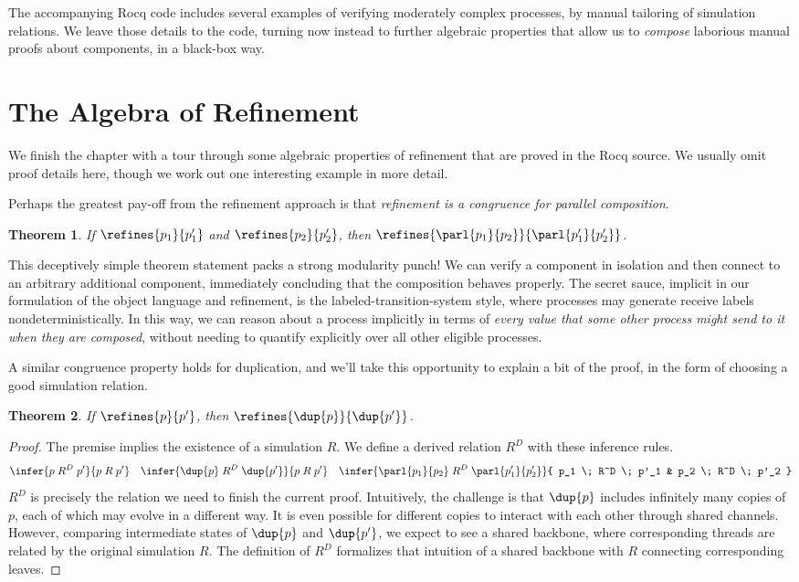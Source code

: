 \documentclass{amsbook}
\newtheorem{theorem}{Theorem}[chapter]
\theoremstyle{definition}
\theoremstyle{remark}
\numberwithin{section}{chapter}
\numberwithin{equation}{chapter}
\begin{document}
The accompanying Rocq code includes several examples of verifying moderately complex processes, by manual tailoring of simulation relations.
We leave those details to the code, turning now instead to further algebraic properties that allow us to \emph{compose} laborious manual proofs about components, in a black-box way.


\section{The Algebra of Refinement}

We finish the chapter with a tour through some algebraic properties of refinement that are proved in the Rocq source.
We usually omit proof details here, though we work out one interesting example in more detail.

Perhaps the greatest pay-off from the refinement approach is that \emph{refinement is a congruence for parallel composition}.
\begin{theorem}
  If $\refines{p_1}{p'_1}$ and $\refines{p_2}{p'_2}$, then $\refines{\parl{p_1}{p_2}}{\parl{p'_1}{p'_2}}$.
\end{theorem}

\modularity
This deceptively simple theorem statement packs a strong modularity punch!
We can verify a component in isolation and then connect to an arbitrary additional component, immediately concluding that the composition behaves properly.
The secret sauce, implicit in our formulation of the object language and refinement, is the labeled-transition-system style, where processes may generate receive labels nondeterministically.
In this way, we can reason about a process implicitly in terms of \emph{every value that some other process might send to it when they are composed}, without needing to quantify explicitly over all other eligible processes.

A similar congruence property holds for duplication, and we'll take this opportunity to explain a bit of the proof, in the form of choosing a good simulation relation.
\begin{theorem}
  If $\refines{p}{p'}$, then $\refines{\dup{p}}{\dup{p'}}$.
\end{theorem}
\begin{proof}
  The premise implies the existence of a simulation $R$.
  We define a derived relation $R^D$ with these inference rules.
  $$\infer{p \; R^D \; p'}{
    p \; R \; p'
  }
  \quad \infer{\dup{p} \; R^D \; \dup{p'}}{
    p \; R \; p'
  }
  \quad \infer{\parl{p_1}{p_2} \; R^D \; \parl{p'_1}{p'_2}}{
    p_1 \; R^D \; p'_1
    & p_2 \; R^D \; p'_2
  }$$
  $R^D$ is precisely the relation we need to finish the current proof.
  Intuitively, the challenge is that $\dup{p}$ includes infinitely many copies of $p$, each of which may evolve in a different way.
  It is even possible for different copies to interact with each other through shared channels.
  However, comparing intermediate states of $\dup{p}$ and $\dup{p'}$, we expect to see a shared backbone, where corresponding threads are related by the original simulation $R$.
  The definition of $R^D$ formalizes that intuition of a shared backbone with $R$ connecting corresponding leaves.
\end{proof}
\end{document}
